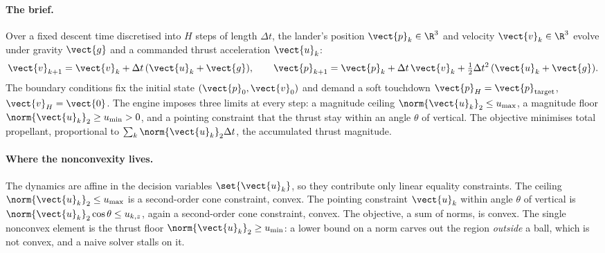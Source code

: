 \paragraph{The brief.}
Over a fixed descent time discretised into $H$ steps of length
$\Delta t$, the lander's position $\vect{p}_{k} \in \R^{3}$ and
velocity $\vect{v}_{k} \in \R^{3}$ evolve under gravity $\vect{g}$ and
a commanded thrust acceleration $\vect{u}_{k}$:
\[
\vect{v}_{k+1} = \vect{v}_{k} + \Delta t\,(\vect{u}_{k} + \vect{g}),
\qquad
\vect{p}_{k+1} = \vect{p}_{k} + \Delta t\, \vect{v}_{k}
+ \tfrac{1}{2}\Delta t^{2}\,(\vect{u}_{k} + \vect{g}).
\]
The boundary conditions fix the initial state $(\vect{p}_{0},
\vect{v}_{0})$ and demand a soft touchdown $\vect{p}_{H} =
\vect{p}_{\text{target}}$, $\vect{v}_{H} = \vect{0}$. The engine
imposes three limits at every step: a magnitude ceiling
$\norm{\vect{u}_{k}}_{2} \leq u_{\max}$, a magnitude floor
$\norm{\vect{u}_{k}}_{2} \geq u_{\min} > 0$, and a pointing constraint
that the thrust stay within an angle $\theta$ of vertical. The
objective minimises total propellant, proportional to $\sum_{k}
\norm{\vect{u}_{k}}_{2} \Delta t$, the accumulated thrust magnitude.

\paragraph{Where the nonconvexity lives.}
The dynamics are affine in the decision variables $\set{\vect{u}_{k}}$,
so they contribute only linear equality constraints. The ceiling
$\norm{\vect{u}_{k}}_{2} \leq u_{\max}$ is a second-order cone
constraint, convex. The pointing constraint $\vect{u}_{k}$ within angle
$\theta$ of vertical is $\norm{\vect{u}_{k}}_{2} \cos\theta \leq
u_{k,z}$, again a second-order cone constraint, convex. The objective,
a sum of norms, is convex. The single nonconvex element is the thrust
floor $\norm{\vect{u}_{k}}_{2} \geq u_{\min}$: a lower bound on a norm
carves out the region \emph{outside} a ball, which is not convex, and a
naive solver stalls on it.

